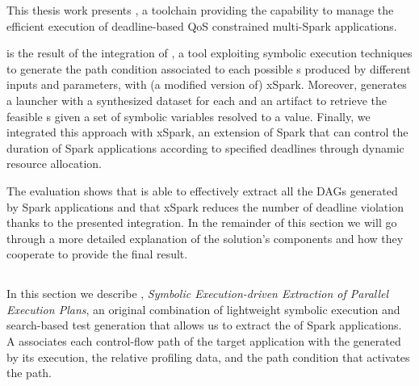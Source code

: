 This thesis work presents \tool, a toolchain providing the capability to manage the efficient execution of deadline-based QoS constrained multi-\plan Spark applications. 

\tool is the result of the integration of \dSymb, a tool exploiting symbolic execution techniques to generate the path condition associated to each possible {\plan}s produced by different inputs and parameters, with (a modified version of) xSpark.
 Moreover, \tool generates a launcher with a synthesized dataset for each \plan and an artifact to retrieve the feasible {\plan}s given a set of symbolic variables  resolved to a value. Finally, we integrated this approach with xSpark, an extension of Spark that can control the duration of Spark applications according to specified deadlines through dynamic resource allocation. 
 
The evaluation shows that \approach is able to effectively extract all the DAGs generated by Spark applications and that xSpark reduces the number of deadline violation thanks to the presented integration.
In the remainder of this section we will go through a more detailed explanation of the solution's components and how they cooperate to provide the final result.

\subsection{\approach}\label{sec:symb}

In this section we describe \approach, \emph{Symbolic Execution-driven Extraction of Parallel Execution Plans}, an original combination of lightweight symbolic execution and search-based test generation that allows us to extract the \model of Spark applications. A \model  associates each control-flow path of the target application with the \plan generated by its execution, the relative profiling data, and the path condition that activates the path. 

